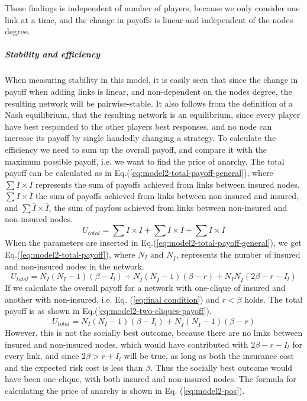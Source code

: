 These findings is independent of number of players, because we only consider one link at a time, and the change in payoffs is linear and independent of the nodes degree.
\subparagraph{Stability and efficiency}
When measuring stability in this model, it is easily seen that since the change in payoff when adding links is linear, and non-dependent on the nodes degree, the resulting network will be pairwise-stable. It also follows from the definition of a Nash equilibrium, that the resulting network is an equilibrium, since every player have best responded to the other players best responses, and no node can increase its payoff by single handedly changing a strategy. 
To calculate the efficiency we need to sum up the overall payoff, and compare it with the maximum possible payoff, i.e. we want to find the price of anarchy. The total payoff can be calculated as in Eq.(\ref{eq:model2-total-payoff-general}), where $\sum I \times I$ represents the sum of payoffs achieved from links between insured nodes. $\sum I \times \overline{I}$ the sum of payoffs achieved from links between non-insured and insured, and $\sum \overline{I} \times \overline{I}$, the sum of payfoss achieved from links between non-insured and non-insured nodes. 
\begin{equation}
U_{total}=\sum I \times I+\sum \overline{I}\times\overline{I}+\sum I\times\overline{I}
\label{eq:model2-total-payoff-general}
\end{equation}
When the parameters are inserted in Eq.(\ref{eq:model2-total-payoff-general}), we get Eq.(\ref{eq:model2-total-payoff}), where $N_{I} \text{ and } N_{\overline{I}}$, represents the number of insured and non-insured nodes in the network.
\begin{equation}
U_{total}=N_{I}(N_{I}-1)(\beta-I_{l})+N_{\overline{I}}(N_{\overline{I}}-1)(\beta-r)+N_{I}N_{\overline{I}}(2\beta-r-I_{l})
\label{eq:model2-total-payoff}
\end{equation}
If we calculate the overall payoff for a network with one-clique of insured and another with non-insured, i.e. Eq. (\ref{eq:final condition}) and $r<\beta$ holds. The total payoff is as shown in Eq.(\ref{eq:model2-two-cliques-payoff}).
\begin{equation}
U_{total}=N_{I}(N_{I}-1)(\beta-I_{l})+N_{\overline{I}}(N_{\overline{I}}-1)(\beta-r)
\label{eq:model2-two-cliques-payoff}
\end{equation}
However, this is not the socially best outcome, because there are no links between insured and non-insured nodes, which would have contributed with $2\beta-r-I_{l}$ for every link, and since $2\beta>r+I_{l}$ will be true, as long as both the insurance cost and the expected risk cost is less than $\beta$. Thus the socially best outcome would have been one clique, with both insured and non-insured nodes. The formula for calculating the price of anarchy is shown in Eq. (\ref{eq:model2-pos}).
